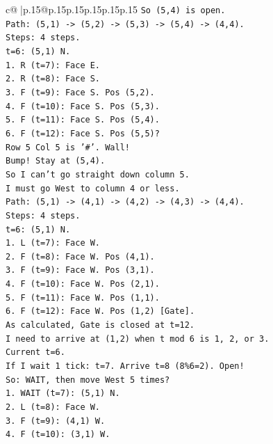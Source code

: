 \documentclass{article}
\begin{document}
{\begin{supertabular}{c@{$\;$}|p{.15\linewidth}@{}p{.15\linewidth}p{.15\linewidth}p{.15\linewidth}p{.15\linewidth}p{.15\linewidth}}
{{{\texttt{So (5,4) is open.} \\
\texttt{Path: (5,1) {-}> (5,2) {-}> (5,3) {-}> (5,4) {-}> (4,4).} \\
\texttt{Steps: 4 steps.} \\
\texttt{t=6: (5,1) N.} \\
\texttt{1. R (t=7): Face E.} \\
\texttt{2. R (t=8): Face S.} \\
\texttt{3. F (t=9): Face S. Pos (5,2).} \\
\texttt{4. F (t=10): Face S. Pos (5,3).} \\
\texttt{5. F (t=11): Face S. Pos (5,4).} \\
\texttt{6. F (t=12): Face S. Pos (5,5)?} \\
\texttt{Row 5 Col 5 is '\#'. Wall!} \\
\texttt{Bump! Stay at (5,4).} \\
\texttt{So I can't go straight down column 5.} \\
\texttt{I must go West to column 4 or less.} \\
\texttt{Path: (5,1) {-}> (4,1) {-}> (4,2) {-}> (4,3) {-}> (4,4).} \\
\texttt{Steps: 4 steps.} \\
\texttt{t=6: (5,1) N.} \\
\texttt{1. L (t=7): Face W.} \\
\texttt{2. F (t=8): Face W. Pos (4,1).} \\
\texttt{3. F (t=9): Face W. Pos (3,1).} \\
\texttt{4. F (t=10): Face W. Pos (2,1).} \\
\texttt{5. F (t=11): Face W. Pos (1,1).} \\
\texttt{6. F (t=12): Face W. Pos (1,2) {[}Gate{]}.} \\
\texttt{As calculated, Gate is closed at t=12.} \\
\texttt{I need to arrive at (1,2) when t mod 6 is 1, 2, or 3.} \\
\texttt{Current t=6.} \\
\texttt{If I wait 1 tick: t=7. Arrive t=8 (8\%6=2). Open!} \\
\texttt{So: WAIT, then move West 5 times?} \\
\texttt{1. WAIT (t=7): (5,1) N.} \\
\texttt{2. L (t=8): Face W.} \\
\texttt{3. F (t=9): (4,1) W.} \\
\texttt{4. F (t=10): (3,1) W.} \\
}}}
\end{supertabular}}
\end{document}
